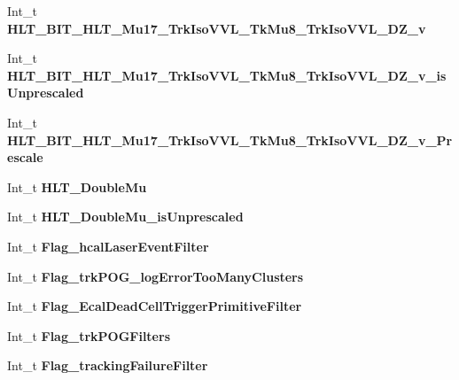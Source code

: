 \begin{DoxyCompactItemize}
Int\+\_\+t {\bfseries H\+L\+T\+\_\+\+B\+I\+T\+\_\+\+H\+L\+T\+\_\+\+Mu17\+\_\+\+Trk\+Iso\+V\+V\+L\+\_\+\+Tk\+Mu8\+\_\+\+Trk\+Iso\+V\+V\+L\+\_\+\+D\+Z\+\_\+v}
\item 
\hypertarget{classMiniTree_ad07af239297c1fd26648ebc5a932c3fa}{}\label{classMiniTree_ad07af239297c1fd26648ebc5a932c3fa} 
Int\+\_\+t {\bfseries H\+L\+T\+\_\+\+B\+I\+T\+\_\+\+H\+L\+T\+\_\+\+Mu17\+\_\+\+Trk\+Iso\+V\+V\+L\+\_\+\+Tk\+Mu8\+\_\+\+Trk\+Iso\+V\+V\+L\+\_\+\+D\+Z\+\_\+v\+\_\+is\+Unprescaled}
\item 
\hypertarget{classMiniTree_af15e3d32c2435750120e9729efdad70a}{}\label{classMiniTree_af15e3d32c2435750120e9729efdad70a} 
Int\+\_\+t {\bfseries H\+L\+T\+\_\+\+B\+I\+T\+\_\+\+H\+L\+T\+\_\+\+Mu17\+\_\+\+Trk\+Iso\+V\+V\+L\+\_\+\+Tk\+Mu8\+\_\+\+Trk\+Iso\+V\+V\+L\+\_\+\+D\+Z\+\_\+v\+\_\+\+Prescale}
\item 
\hypertarget{classMiniTree_aaf3da79df8e08ffe85c8cf34fa128e53}{}\label{classMiniTree_aaf3da79df8e08ffe85c8cf34fa128e53} 
Int\+\_\+t {\bfseries H\+L\+T\+\_\+\+Double\+Mu}
\item 
\hypertarget{classMiniTree_ac094c5c5de3065ba53afad719f558531}{}\label{classMiniTree_ac094c5c5de3065ba53afad719f558531} 
Int\+\_\+t {\bfseries H\+L\+T\+\_\+\+Double\+Mu\+\_\+is\+Unprescaled}
\item 
\hypertarget{classMiniTree_a1db478e56fdcd75941742fa834c0d7e5}{}\label{classMiniTree_a1db478e56fdcd75941742fa834c0d7e5} 
Int\+\_\+t {\bfseries Flag\+\_\+hcal\+Laser\+Event\+Filter}
\item 
\hypertarget{classMiniTree_a8911a0de2f0ebf0ba1577dc1013b4cce}{}\label{classMiniTree_a8911a0de2f0ebf0ba1577dc1013b4cce} 
Int\+\_\+t {\bfseries Flag\+\_\+trk\+P\+O\+G\+\_\+log\+Error\+Too\+Many\+Clusters}
\item 
\hypertarget{classMiniTree_a3705e76bd48ed6c5f28086043ff584ca}{}\label{classMiniTree_a3705e76bd48ed6c5f28086043ff584ca} 
Int\+\_\+t {\bfseries Flag\+\_\+\+Ecal\+Dead\+Cell\+Trigger\+Primitive\+Filter}
\item 
\hypertarget{classMiniTree_aedd9d518ad0b0fa90bc9bac6e1b30940}{}\label{classMiniTree_aedd9d518ad0b0fa90bc9bac6e1b30940} 
Int\+\_\+t {\bfseries Flag\+\_\+trk\+P\+O\+G\+Filters}
\item 
\hypertarget{classMiniTree_aec9f752e6fb5306eb358a02a8ddcdcb1}{}\label{classMiniTree_aec9f752e6fb5306eb358a02a8ddcdcb1} 
Int\+\_\+t {\bfseries Flag\+\_\+tracking\+Failure\+Filter}
\item 
\hypertarget{classMiniTree_a9f16665933abe8c04bf8d08ed0b04113}{}\label{classMiniTree_a9f16665933abe8c04bf8d08ed0b04113} 

\end{DoxyCompactItemize}
